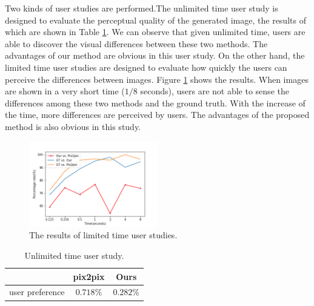 Two kinds of user studies are performed.The unlimited time user study is designed to evaluate the perceptual quality of the generated image, the results of which are shown in Table \ref{table:unlimited_time}. We can observe that given unlimited time, users are able to discover the visual differences between these two methods. The advantages of our method are obvious in this user study. On the other hand, the limited time user studies are designed to evaluate how quickly the users can perceive the differences between images. Figure \ref{fig:limited_time} shows the results. When images are shown in a very short time ($1/8$ seconds), users are not able to sense the differences among these two methods and the ground truth. With the increase of the time, more differences are perceived by users. The advantages of the proposed method is also obvious in this study.
%
\begin{figure}
	\includegraphics[width=0.5\textwidth]{figures/limited_time}
	\caption{The results of limited time user studies. }
	\label{fig:limited_time}
\end{figure}
%
%
\begin{table}[h]
	\centering	
	\caption{Unlimited time user study.}
	\begin{tabular}{|l|c|c|}\hline
		 & pix2pix \cite{pix2pix} & Ours \\\hline
		user preference&$0.718\%$&$0.282\%$\\\hline
	\end{tabular}
	\label{table:unlimited_time}
\end{table}


